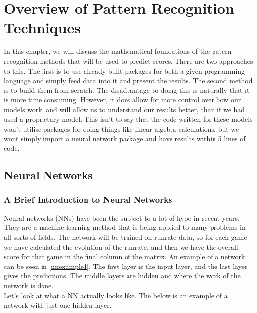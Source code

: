 \chapter{Overview of Pattern Recognition Techniques}

In this chapter, we will discuss the mathematical foundations of the patern recognition methods that will be used to predict 
scores. There are two approaches to this. The first is to use already built packages for both a given programming language and simply
feed data into it and present the results. The second method is to build them from scratch. The disadvantage to doing this is naturally 
that it is more time consuming. However, it does allow for more control over how our models work, and will allow us to understand our results
better, than if we had used a proprietary model. This isn't to say that the code written for these models won't utilise packages for doing things
like linear algebra calculations, but we wont simply import a neural network package and have results within 5 lines of code. \\



\section{Neural Networks}

\subsection{A Brief Introduction to Neural Networks}
Neural networks (NNs) have been the subject to a lot of hype in recent years. They are a machine learning method that is being applied to many problems
in all sorts of fields.  %
The network will be trained on runrate data, so for each game we have calculated the evolution of the runrate,
and then we have the overall score for that game in the final column of the matrix. An example of a network can be seen in \ref{nnexample1}. The first layer is the 
input layer, and the last layer gives the predictions. The middle layers are hidden and where the work of the network is done. \\

Let's look at what a NN actually looks like. The below is an example of a network with just one hidden layer.

